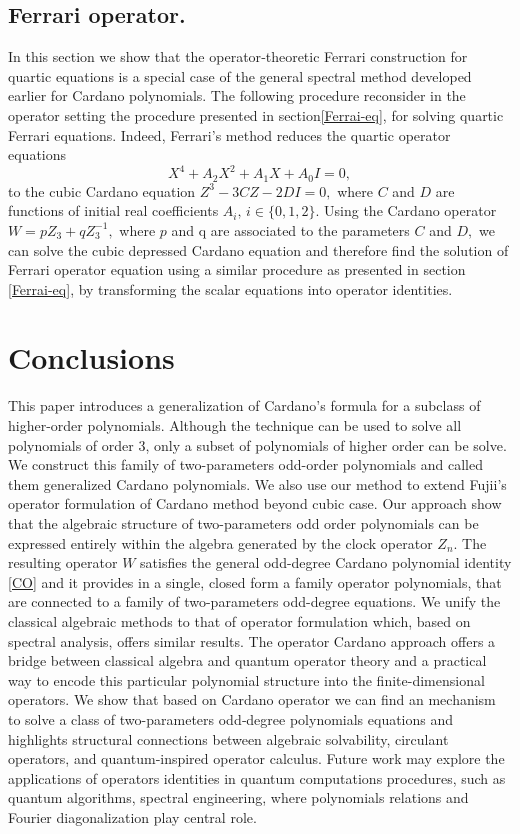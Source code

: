 \documentclass[11pt,reqno]{amsart}
\begin{document}
\subsection{Ferrari operator.}
In this section we show that the operator‑theoretic Ferrari construction for quartic equations is a special case of the general spectral method developed earlier for Cardano polynomials. The following procedure reconsider in the operator setting the procedure presented in section\eqref{Ferrai-eq}, for solving quartic Ferrari equations. Indeed, Ferrari’s method reduces the quartic operator equations
\begin{equation}
    X^4+A_2X^2+A_1X+A_0I=0,
\end{equation}
to the cubic Cardano equation $Z^3-3CZ-2DI=0,$ where $C$ and $D$ are functions of initial real coefficients $A_i,\, i\in\{0,1,2\}$.
Using the Cardano operator $W=pZ_3+qZ_3^{-1},$ where $p$ and q are associated to the parameters $C$ and $D,$ we can solve the cubic depressed Cardano equation and therefore find the solution of Ferrari operator equation using  a similar procedure as presented in section \eqref{Ferrai-eq}, by transforming  the scalar equations into operator identities.
\vspace{0.3cm}
\section{Conclusions}\label{s:cl}
This paper introduces a generalization of Cardano's formula for a subclass of higher-order polynomials. Although the technique can be used to solve all polynomials of order 3, only a subset of polynomials of higher order can be solve. We construct this family of two-parameters odd-order polynomials and called them generalized Cardano polynomials. We also use our method to 
 extend Fujii's operator formulation\cite{Fujii2013} of Cardano method beyond cubic case. Our approach  show that the algebraic structure of two-parameters odd order polynomials can be expressed entirely within the algebra generated by the clock operator $Z_n$.
The resulting operator $W$ satisfies the general odd-degree Cardano polynomial identity \eqref{CO} and it provides in a single, closed form a family operator polynomials, that are connected to a family of two-parameters odd-degree equations.
We unify the classical algebraic methods to that of operator formulation which, based on spectral analysis, offers similar results.
The operator Cardano approach offers a bridge between classical algebra and quantum operator theory and a practical way to encode this particular polynomial structure into the finite-dimensional operators.  We show that based on Cardano operator we can find  an mechanism to solve a class of two-parameters odd‑degree polynomials equations and highlights structural connections between algebraic solvability, circulant operators, and quantum‑inspired operator calculus.  Future work may explore the applications of operators identities in quantum computations procedures, such as quantum algorithms, spectral engineering, where polynomials relations and Fourier diagonalization play central role.
\vspace{0.3cm}
\end{document}
